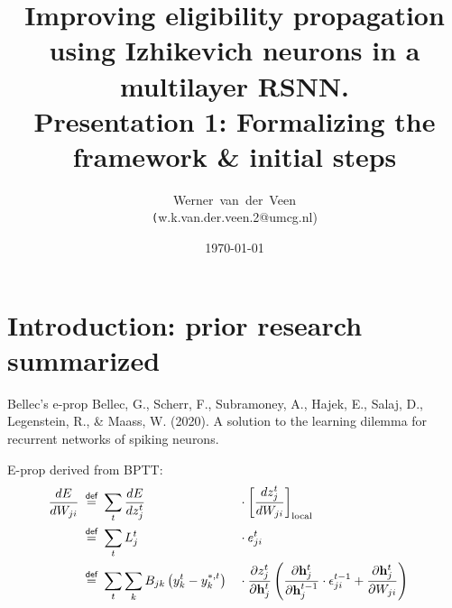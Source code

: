 \documentclass[t]{beamer}
\title[Eligibility propagation]{Improving eligibility propagation using Izhikevich neurons in a multilayer RSNN.\\\vspace{10pt}
\large{Presentation 1: Formalizing the framework \& initial steps}}
\author[Werner]{Werner~van~der~Veen\\\tiny\texttt({w.k.van.der.veen.2@umcg.nl})}\date{\today}
\newcommand\eqdef{\ \mathrel{\overset{\makebox[0pt]{\mbox{\normalfont\scriptsize\sffamily def}}}{=}}\ }
\begin{document}
\begin{frame}
    \titlepage
\end{frame}



\small
\section{Introduction: prior research summarized}

\begin{frame}{Bellec's e-prop}
    Bellec, G., Scherr, F., Subramoney, A., Hajek, E., Salaj, D., Legenstein, R., \& Maass, W. (2020). A solution to the learning dilemma for recurrent networks of spiking neurons.
    
    E-prop derived from BPTT:
    \begin{align}
        \frac{dE}{dW_{ji}} 
        &\eqdef \sum_t\frac{dE}{dz_j^t} & &\cdot\left[\frac{dz^t_j}{dW_{ji}}\right]_\text{local}&\\
        &\eqdef \sum_tL_j^t & &\cdot e^t_{ji}&\\
        &\eqdef \sum_t\sum_kB_{jk}\left(y_k^t-y_k^{*,t}\right) & &\cdot \frac{\partial z^t_j}{\partial \mathbf{h}^t_j}\left(\frac{\partial \mathbf{h}_j^t}{\partial\mathbf{h}_j^{t-1}}\cdot\mathbf{\epsilon}_{ji}^{t-1} + \frac{\partial\mathbf{h}^t_j}{\partial W_{ji}}\right)&
    \end{align}
\end{frame}
\end{document}
